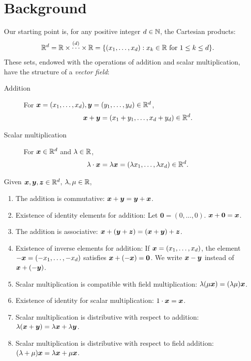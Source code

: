 

\chapter{Background}

Our starting point is, for any positive integer $d \in \mathbb{N}$, the
Cartesian products:
\begin{equation*}
\mathbb{R}^d = \mathbb{R} \times \overset{(d)}{\dotsm} \times \mathbb{R} =\{ (x_1, \dotsc, x_d) : x_k \in \mathbb{R} \text{ for } 1\leq k \leq d\}.
\end{equation*}
These sets, endowed with the operations of addition and scalar multiplication, have the structure of a \emph{vector field}:
\begin{description}
	\item[Addition] For $\boldsymbol{x} = (x_1, \dotsc, x_d), \boldsymbol{y} = (y_1, \dotsc, y_d) \in \mathbb{R}^d$, 
	\begin{equation*}
	\boldsymbol{x} + \boldsymbol{y} = (x_1+y_1, \dotsc, x_d+y_d) \in \mathbb{R}^d.
	\end{equation*}
	\item[Scalar multiplication] For $\boldsymbol{x} \in \mathbb{R}^d$ and $\lambda \in \mathbb{R}$, 
	\begin{equation*}
	\lambda \cdot \boldsymbol{x} = \lambda \boldsymbol{x} = (\lambda x_1, \dotsc, \lambda x_d) \in \mathbb{R}^d.
	\end{equation*}
\end{description}
Given $\boldsymbol{x}, \boldsymbol{y}, \boldsymbol{z} \in \mathbb{R}^d$, $\lambda, \mu \in \mathbb{R}$,
\begin{enumerate}
	\item The addition is commutative: $\boldsymbol{x} + \boldsymbol{y} = \boldsymbol{y} + \boldsymbol{x}$.
	\item Existence of identity elements for addition: Let $\boldsymbol{0} = (0, \dotsc, 0)$. $\boldsymbol{x} + \boldsymbol{0} = \boldsymbol{x}$. 
	\item The addition is associative: $\boldsymbol{x} + (\boldsymbol{y} + \boldsymbol{z}) = (\boldsymbol{x} + \boldsymbol{y}) + \boldsymbol{z}$.
	\item Existence of inverse elements for addition: If $\boldsymbol{x} = (x_1, \dotsc, x_d)$, the element $-\boldsymbol{x} = (-x_1, \dotsc, -x_d)$ satisfies $\boldsymbol{x} + (-\boldsymbol{x}) = \boldsymbol{0}$.  We write $\boldsymbol{x} - \boldsymbol{y}$ instead of $\boldsymbol{x} + (-\boldsymbol{y})$.
	\item Scalar multiplication is compatible with field multiplication: $\lambda (\mu \boldsymbol{x}) = (\lambda \mu) \boldsymbol{x}$.
	\item Existence of identity for scalar multiplication: $1 \cdot \boldsymbol{x} = \boldsymbol{x}$.
	\item Scalar multiplication is distributive with respect to addition: $\lambda (\boldsymbol{x} + \boldsymbol{y}) = \lambda \boldsymbol{x} + \lambda \boldsymbol{y}$.
	\item Scalar multiplication is distributive with respect to field addition: $(\lambda + \mu)\boldsymbol{x} = \lambda \boldsymbol{x} + \mu\boldsymbol{x}$.
\end{enumerate}
